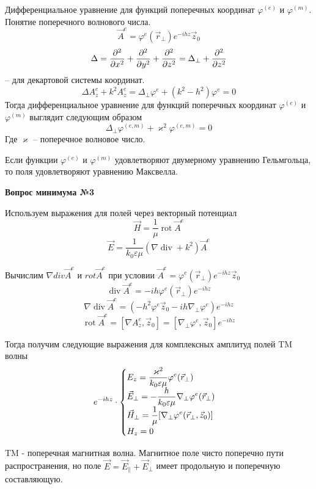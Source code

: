 \documentclass[a4paper,14pt]{extarticle}
\DeclareMathOperator{\Div}{div}
\DeclareMathOperator{\Rot}{rot}
\renewcommand{\phi}{\varphi}
\renewcommand{\epsilon}{\varepsilon}
\renewcommand{\kappa}{\varkappa}
\newcommand{\ticket}[1] {
\newpage
\hypertarget{num#1}{}
\begin{center}
	\textbf{Вопрос минимума №#1 }
\end{center}
}
\begin{document}
	Дифференциальное уравнение для функций поперечных координат $\phi^{(e)}$ и $\phi^{(m)}$. Понятие поперечного волнового числа.
	$$\vec{A}^e = \phi^e(\vec{r}_\perp)e^{-ihz}\vec{z}_0$$
	$$\Delta = \pdv[2]{}{x}+\pdv[2]{}{y}+\pdv[2]{}{z}=\Delta_\perp+\pdv[2]{}{z}$$ -- для декартовой системы координат.
	$$\Delta A_z^e + k^2 A_z^e=\Delta_\perp\phi^e + (k^2-h^2)\phi^e=0$$
	Тогда дифференциальное уравнение для функций поперечных координат $\phi^{(e)}$ и $\phi^{(m)}$  выглядит следующим образом
	$$\Delta_\perp\phi^{(e,m)} + \kappa^2\phi^{(e,m)}=0$$
	Где $\kappa$ -- поперечное волновое число. 	
	
	Если функции $\phi^{(e)}$ и $\phi^{(m)}$ удовлетворяют двумерному уравнению Гельмгольца, то поля удовлетворяют уравнению Максвелла.
	
	\ticket{3}
	Используем выражения для полей через векторный потенциал
	$$\vec{H}=\frac{1}{\mu} \Rot\vec{A}^e $$
	$$\vec{E}=\frac{1}{k_0\epsilon\mu}(\nabla \Div + k^2)\vec{A}^e $$
	
	Вычислим $\nabla div \vec{A}^e$ и $rot \vec{A}^e$ при условии $\vec{A}^e = \phi^e(\vec{r}_\perp)e^{-ihz}\vec{z}_0$
	$$\Div \vec{A}^e = -ih\phi^e(\vec{r}_\perp)e^{-ihz}$$
	$$\nabla \Div \vec{A}^e = (-h^2\phi^e\vec{z}_0-ih\nabla_\perp\phi^e)e^{-ihz}$$
	$$\Rot \vec{A}^e = [\nabla A^e_z,\vec{z}_0] = [\nabla_\perp\phi^e,\vec{z}_0]e^{-ihz}$$
	
	Тогда получим следующие выражения для комплексных амплитуд полей TM волны 
	\begin{displaymath}
	e^{-ihz}\cdot
	\begin{cases}
	$$\displaystyle E_z = \frac{\kappa^2}{k_0\epsilon\mu}\phi^e(\vec{r}_\perp)$$ \\
	$$\displaystyle\vec{E}_\perp = -\frac{h}{k_0\epsilon\mu}\nabla_\perp\phi^e(\vec{r}_\perp)$$ \\
	$$\displaystyle\vec{H}_\perp = \frac{1}{\mu}[\nabla_\perp\phi^e(\vec{r}_\perp,\vec{z}_0)]$$ \\
	$$\displaystyle H_z = 0$$
	\end{cases}
	\end{displaymath}

	TM - поперечная магнитная волна. Магнитное поле чисто поперечно пути распространения, но поле $\vec{E}=\vec{E}_\parallel+\vec{E}_\perp$ имеет продольную и поперечную составляющую.
	
\end{document}
